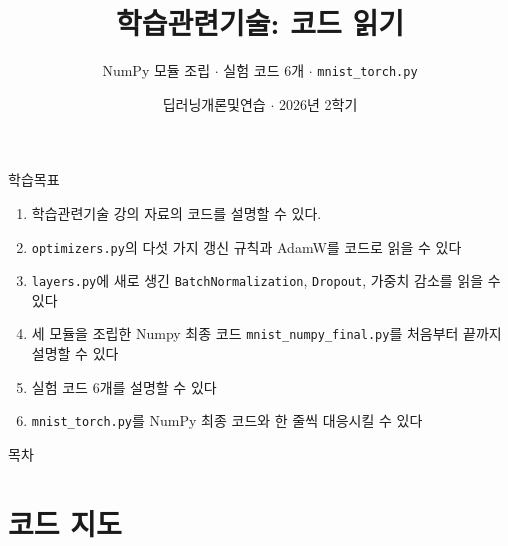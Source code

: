 \documentclass[aspectratio=169,11pt]{beamer}
\title{학습관련기술: 코드 읽기}
\subtitle{NumPy 모듈 조립 $\cdot$ 실험 코드 6개 $\cdot$ \texttt{mnist\_torch.py}}
\date{딥러닝개론및연습 $\cdot$ 2026년 2학기}
\newcommand{\code}[1]{\texttt{#1}}
\begin{document}
\begin{frame}[plain]
\titlepage
\end{frame}


\begin{frame}{학습목표}
\begin{enumerate}
    \item 학습관련기술 강의 자료의 코드를 설명할 수 있다.
\item \code{optimizers.py}의 다섯 가지 갱신 규칙과 AdamW를 코드로 읽을 수 있다
\item \code{layers.py}에 새로 생긴 \code{BatchNormalization}, \code{Dropout}, 가중치 감소를 읽을 수 있다
\item 세 모듈을 조립한 Numpy 최종 코드 \code{mnist\_numpy\_final.py}를 처음부터 끝까지 설명할 수 있다
\item 실험 코드 6개를 설명할 수 있다
\item \code{mnist\_torch.py}를 NumPy 최종 코드와 한 줄씩 대응시킬 수 있다
\end{enumerate}
\end{frame}

\begin{frame}{목차}
\footnotesize
\tableofcontents
\end{frame}

\section{코드 지도}
\end{document}
